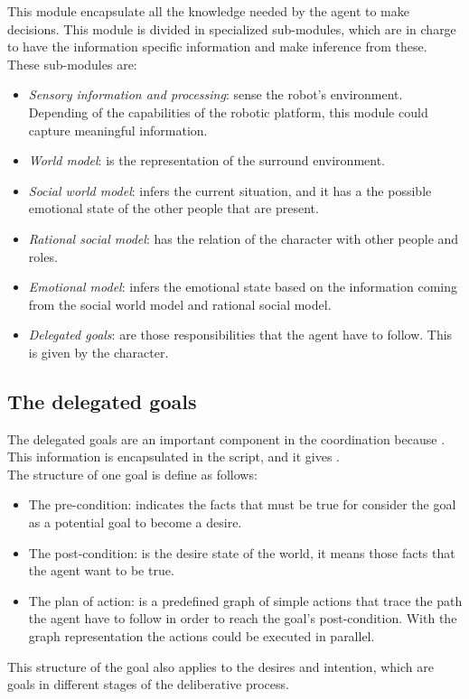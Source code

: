 This module encapsulate all the knowledge needed by the agent to make decisions. This module is divided in specialized sub-modules, which are in charge to have the information specific information and make inference from these. These sub-modules are:
\begin{itemize}
	\item \textit{Sensory information and processing}: sense the robot's environment. Depending of the capabilities of the robotic platform, this module could capture meaningful information.
	\item \textit{World model}: is the representation of the surround environment.
	\item \textit{Social world model}: infers the current situation, and it has a the possible emotional state of the other people that are present.
	\item \textit{Rational social model}: has the relation of the character with other people and roles.
	\item \textit{Emotional model}: infers the emotional state based on the information coming from the social world model and rational social model.
	\item \textit{Delegated goals}: are those responsibilities that the agent have to follow. This is given by the character. 
\end{itemize}
\subsection{The delegated goals}
The delegated goals are an important component in the coordination because . This information is encapsulated in the script, and it gives .\\ 
The structure of one goal is define as follows:
\begin{itemize}
\item The pre-condition: indicates the facts that must be true for consider the goal as a potential goal to become a desire. 

\item The post-condition: is the desire state of the world, it means those facts that the agent want to be true. 

\item The plan of action: is a predefined graph of simple actions that trace the path the agent have to follow in order to reach the goal's post-condition. With the graph representation the actions could be executed in parallel. 
\end{itemize}
This structure of the goal also applies to the desires and intention, which are goals in different stages of the deliberative process. 
